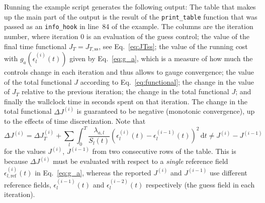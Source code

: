 \documentclass[submission, Phys]{SciPost}
\newcommand{\dd}[0]{\,\text{d}}
\begin{document}
\vspace{12pt}
{%
\parindent0pt Running the example script generates the following output: }
%
\vspace{12pt} 
The table that makes up the main part of the output is the result of the
\texttt{print\_table} function that was passed as an \texttt{info\_hook} in
line~84 of the example.
The columns are the iteration number, where iteration 0 is an evaluation of the
guess control; the value of the final time functional $J_T = J_{T,\text{ss}}$,
see Eq.~\eqref{eq:JTss}; the value of the running cost with
$g_a(\epsilon_l^{(i)}(t))$ given by Eq.~\eqref{eq:g_a}, which is a measure of
how much the controls change in each iteration and thus allows to gauge
convergence; the value of the total functional $J$ according to
Eq.~\eqref{eq:functional}; the change in the value of $J_T$ relative to the
previous iteration; the change in the total functional $J$; and finally the
wallclock time in seconds spent on that iteration.
The change in the total functional $\Delta J^{(i)}$ is guaranteed to be negative
(monotonic convergence), up to the effects of time discretization.
Note that
\begin{equation}
  \Delta J^{(i)} =
    \Delta J_T^{(i)} + \sum_l \int_0^T
    \frac{\lambda_{a,l}}{S_l(t)}
    \left(\epsilon_l^{(i)}(t) - \epsilon_l^{(i-1)}(t)\right)^2 \dd t
  \neq J^{(i)} - J^{(i-1)}
\end{equation}
for the values $J^{(i)}$, $J^{(i-1)}$ from two consecutive rows of the table.
This is because $\Delta J^{(i)}$ must be evaluated with respect to
a \emph{single} reference field $\epsilon_{l,\text{ref}}^{(i)}(t)$ in
Eq.~\eqref{eq:g_a}, whereas the reported $J^{(i)}$ and $J^{(i-1)}$ use different
reference fields, $\epsilon_{l}^{(i-1)}(t)$ and $\epsilon_{l}^{(i-2)}(t)$
respectively (the guess field in each iteration).
\end{document}
